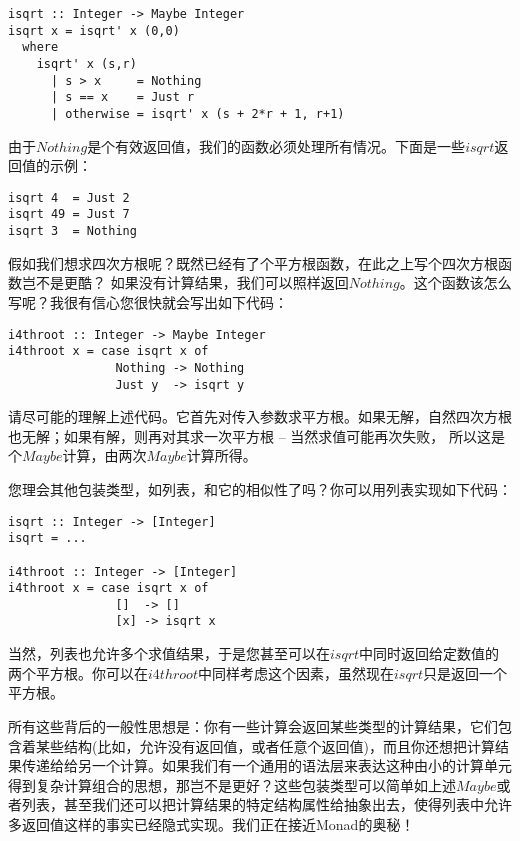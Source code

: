 \begin{lstlisting}
isqrt :: Integer -> Maybe Integer
isqrt x = isqrt' x (0,0)
  where
    isqrt' x (s,r)
      | s > x     = Nothing
      | s == x    = Just r
      | otherwise = isqrt' x (s + 2*r + 1, r+1)
\end{lstlisting}

由于$Nothing$是个有效返回值，我们的函数必须处理所有情况。下面是一些$isqrt$返回值的示例：

\begin{lstlisting}
isqrt 4  = Just 2
isqrt 49 = Just 7
isqrt 3  = Nothing
\end{lstlisting}

假如我们想求四次方根呢？既然已经有了个平方根函数，在此之上写个四次方根函数岂不是更酷？ 如果没有计算结果，我们可以照样返回$Nothing$。这个函数该怎么写呢？我很有信心您很快就会写出如下代码：

\begin{lstlisting}
i4throot :: Integer -> Maybe Integer
i4throot x = case isqrt x of
               Nothing -> Nothing
               Just y  -> isqrt y
\end{lstlisting}

请尽可能的理解上述代码。它首先对传入参数求平方根。如果无解，自然四次方根也无解；如果有解，则再对其求一次平方根 -- 当然求值可能再次失败， 所以这是个$Maybe$计算，由两次$Maybe$计算所得。

您理会其他包装类型，如列表，和它的相似性了吗？你可以用列表实现如下代码：

\begin{lstlisting}
isqrt :: Integer -> [Integer]
isqrt = ...

i4throot :: Integer -> [Integer]
i4throot x = case isqrt x of
               []  -> []
               [x] -> isqrt x
\end{lstlisting}

当然，列表也允许多个求值结果，于是您甚至可以在$isqrt$中同时返回给定数值的两个平方根。你可以在$i4throot$中同样考虑这个因素，虽然现在$isqrt$只是返回一个平方根。

所有这些背后的一般性思想是：你有一些计算会返回某些类型的计算结果，它们包含着某些结构(比如，允许没有返回值，或者任意个返回值)，而且你还想把计算结果传递给给另一个计算。如果我们有一个通用的语法层来表达这种由小的计算单元得到复杂计算组合的思想，那岂不是更好？这些包装类型可以简单如上述$Maybe$或者列表，甚至我们还可以把计算结果的特定结构属性给抽象出去，使得列表中允许多返回值这样的事实已经隐式实现。我们正在接近Monad的奥秘！
